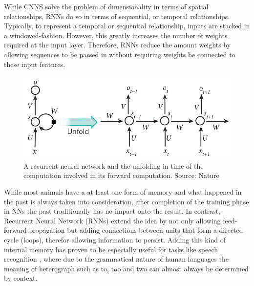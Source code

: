 While CNNS solve the problem of dimensionality in terms of spatial relationships, RNNs do so in terms of sequential, or temporal relationships.  Typically, to represent a temporal or sequential relationship, inputs are stacked in a windowed-fashion.  However, this greatly increases the number of weights required at the input layer.  Therefore, RNNs reduce the amount weights by allowing sequences to be passed in without requiring weights be connected to these input features.




\begin{figure}[h]
    \centering
	\includegraphics[width=.8\textwidth]{./images/illustrations/rnn}
    \caption{A recurrent neural network and the unfolding in time of the computation involved in its forward computation. Source: Nature}
    \label{fig:rnn}
\end{figure}



While most animals have a at least one form of memory and what happened in the past is always taken into consideration, after completion of the training phase in NNs the past traditionally has no impact onto the result. 
In contrast, Recurrent Neural Network (RNNs) extend the idea by not only allowing feed-forward propagation but adding connections between units that form a directed cycle (loops), therefor allowing information to persist. 
Adding this kind of internal memory has proven to be especially useful for tasks like speech recognition \cite{sak2014long}, where due to the grammatical nature of human languages the meaning of heterograph such as to, too and two can almost always be determined by context.




